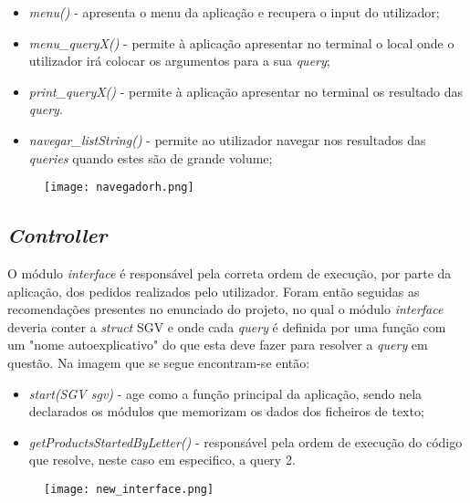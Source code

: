 \documentclass{article}
\newenvironment{mpar}{\par\noindent\minipage{\linewidth}
\setlength{\parindent}{1em}}{\endminipage\par\medskip}
\begin{document}
\begin{mpar}{}
\begin{itemize}
\item  \textit{menu()} -  apresenta o menu da aplicação e recupera o input do utilizador;
\item  \textit{menu\_queryX()} - permite à aplicação apresentar no terminal o local onde o utilizador irá colocar os argumentos para a sua \textit{query};
\item  \textit{print\_queryX()} - permite à aplicação apresentar no terminal os resultado das \textit{query}.
\item  \textit{navegar\_listString()} - permite ao utilizador navegar nos resultados das \textit{queries} quando estes são de grande volume;
\end{itemize}

\begin{figure}[H]
\texttt{[image: navegadorh.png]}
\centering
\end{figure}


\end{mpar}

\subsection{\textit{Controller}}

O módulo \textit{interface} é responsável pela correta ordem de execução, por parte da aplicação, dos pedidos realizados pelo utilizador. Foram então seguidas as recomendações presentes no enunciado do projeto, no qual o módulo \textit{interface} deveria conter a \textit{struct} SGV e onde cada \textit{query} é definida por uma função com um "nome autoexplicativo" do que esta deve fazer para resolver a \textit{query} em questão. Na imagem que se segue encontram-se então: 

\begin{itemize}
\item \textit{start(SGV sgv)} -  age como a função principal da aplicação, sendo nela declarados os módulos que memorizam os dados dos ficheiros de texto;
\item \textit{getProductsStartedByLetter()} - responsável pela ordem de execução do código que resolve, neste caso em especifico, a query 2.
\end{itemize}

\begin{figure}[H]
\texttt{[image: new\_interface.png]}
\centering
\end{figure}
\end{document}
